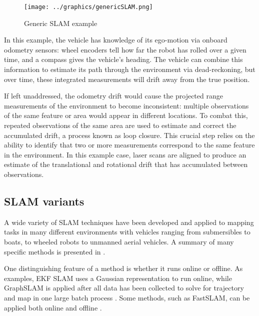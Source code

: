  \begin{figure}[!htb]
   \centering
   \texttt{[image: ../graphics/genericSLAM.png]} %
   \caption{ Generic SLAM example}
   \label{fig:GenericSLAM}
\end{figure}


In this example, the vehicle has knowledge of its ego-motion via onboard odometry sensors: wheel encoders tell how far the robot has rolled over a given time, and a compass gives the vehicle's heading. The vehicle can combine this information to estimate its path through the environment via dead-reckoning, but over time, these integrated measurements will drift away from the true position.

If left unaddressed, the odometry drift would cause the projected range measurements of the environment to become inconsistent: multiple observations of the same feature or area would appear in different locations. To combat this, repeated observations of the same area are used to estimate and correct the accumulated drift, a process known as loop closure. This crucial step relies on the ability to identify that two or more measurements correspond to the same feature in the environment. In this example case, laser scans are aligned to produce an estimate of the translational and rotational drift that has accumulated between observations. 


\subsection{SLAM variants}

A wide variety of SLAM techniques have been developed and applied to mapping tasks in many different environments with vehicles ranging from submersibles to boats, to wheeled robots to unmanned aerial vehicles. A summary of many specific methods is presented in \cite{SLAMoverview}. 

One distinguishing feature of a method is whether it runs online or offline. As examples, EKF SLAM uses a Gaussian representation to run online, while GraphSLAM is applied after all data has been collected to solve for trajectory and map in one large batch process \cite{Thrun2005}. Some methods, such as FastSLAM, can be applied both online and offline \cite{Montemerlo2002}.

